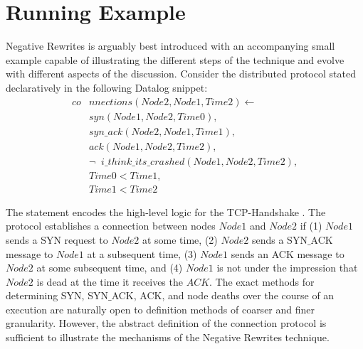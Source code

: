 \section{Running Example}
Negative Rewrites is arguably best introduced with an accompanying small example capable of illustrating the different steps of the technique and evolve with different aspects of the discussion. Consider the distributed protocol stated declaratively in the following Datalog snippet:
\begin{align}
co&nnections( Node2, Node1, Time2 ) \leftarrow \\
	&syn( Node1, Node2, Time0 ), \\
	&syn\_ack( Node2, Node1, Time1 ), \\
	&ack( Node1, Node2, Time2 ), \\
	&\neg \;\; i\_think\_its\_crashed( Node1, Node2, Time2 ), \\
	&Time0<Time1, \\
	&Time1<Time2
\label{tcp}
\end{align}

The statement encodes the high-level logic for the TCP-Handshake \cite{RFC0793}. The protocol establishes a connection between nodes $Node1$ and $Node2$ if (1) $Node1$ sends a SYN request to $Node2$ at some time, (2) $Node2$ sends a SYN$\_$ACK message to $Node1$ at a subsequent time, (3) $Node1$ sends an ACK message to $Node2$ at some subsequent time, and (4) $Node1$ is not under the impression that $Node2$ is dead at the time it receives the $ACK$. The exact methods for determining SYN, SYN$\_$ACK, ACK, and node deaths over the course of an execution are naturally open to definition methods of coarser and finer granularity. However, the abstract definition of the connection protocol is sufficient to illustrate the mechanisms of the Negative Rewrites technique.